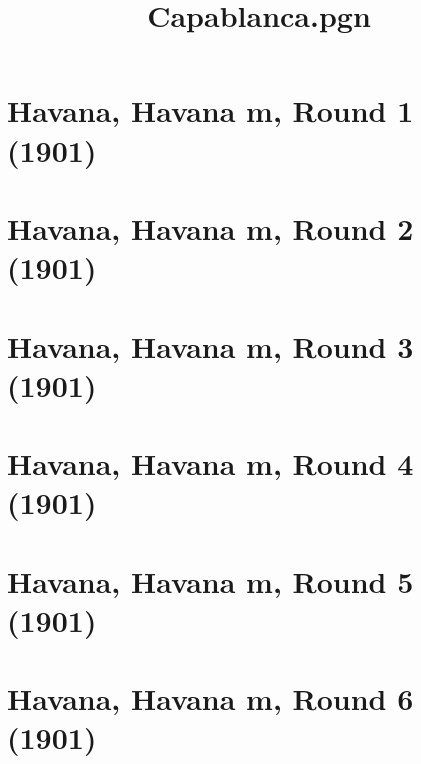 \documentclass[11pt]{article}
\title{Capablanca.pgn}
\newcommand*\cleartoleftpage{%
   \clearpage
   \ifodd\value{page}\hbox{}\newpage\fi
}
\begin{document}
\maketitle

\newpage

\tableofcontents
\newpage

\printindex

\cleartoleftpage
\section{Havana, Havana m, Round 1 (1901)}


\clearpage

\section{Havana, Havana m, Round 2 (1901)}


\clearpage

\section{Havana, Havana m, Round 3 (1901)}


\clearpage

\section{Havana, Havana m, Round 4 (1901)}


\clearpage

\section{Havana, Havana m, Round 5 (1901)}


\clearpage

\section{Havana, Havana m, Round 6 (1901)}

\end{document}
